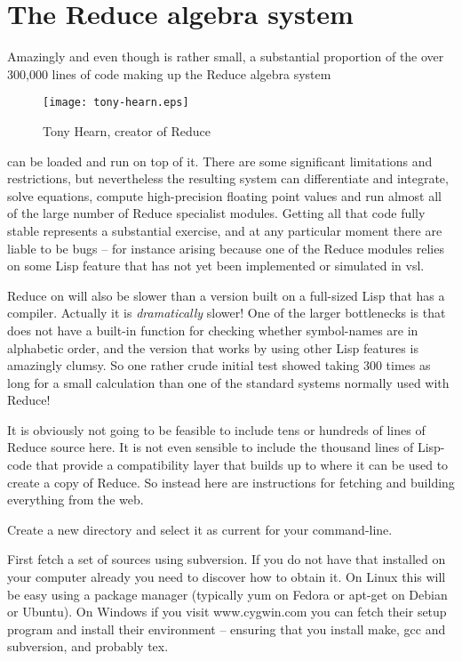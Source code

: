 \section{The Reduce algebra system}
Amazingly and even though \vsl{} is rather small, a substantial
proportion of the over 300,000 lines of code making up the Reduce
algebra system
\begin{wrapfigure}{l}{2.5in}
{\centering
\texttt{[image: tony-hearn.eps]}}
\caption{Tony Hearn, creator of Reduce}
\end{wrapfigure} can be loaded and run on top of it. There are some
significant limitations and restrictions, but nevertheless the resulting
system can differentiate and integrate, solve equations, compute
high-precision floating point values and run almost all of the large
number of Reduce specialist modules. Getting all that code fully stable
represents a substantial exercise, and at any particular moment there
are liable to be bugs -- for instance arising because one of the Reduce
modules relies on some Lisp feature that has not yet been implemented
or simulated in vsl{}.

Reduce on \vsl{} will also be slower than a version built on a full-sized
Lisp that has a compiler. Actually it is {\em dramatically} slower! One of
the larger bottlenecks is that \vsl{} does not have a built-in function for
checking whether symbol-names are in alphabetic order, and the version that
works by using other Lisp features is amazingly clumsy. So one rather crude
initial test showed \vsl{} taking 300 times as long for a small calculation
than one of the standard systems normally used with Reduce!

It is obviously not going to be feasible to include tens or hundreds of
lines of Reduce source here. It is not even sensible to include the thousand
lines of Lisp-code that provide a compatibility layer that builds \vsl{} up to
where it can be used to create a copy of Reduce. So instead here are
instructions for fetching and building everything from the web.

Create a new directory and select it as current for your command-line.

First fetch a set of \vsl sources using {\tx subversion}. If you do not have that
installed on your computer already you need to discover how to obtain it.
On Linux this will be easy using a package manager (typically {\tx yum}
on Fedora or {\tx apt-get} on Debian or Ubuntu). On Windows if you visit
{\tx www.cygwin.com} you can fetch their setup program and install their
environment -- ensuring that you install {\tx make}, {\tx gcc} and
{\tx subversion}, and probably {\tx tex}.

